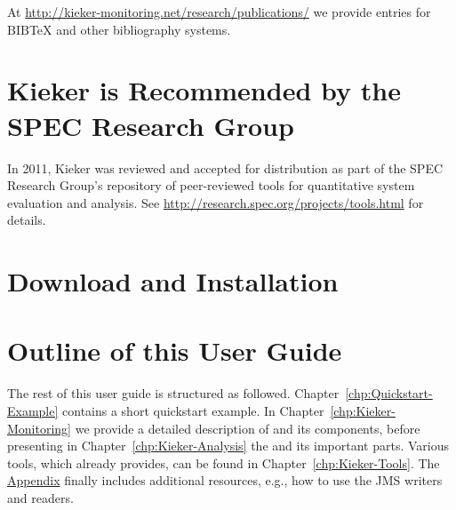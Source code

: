 		\noindent At \url{http://kieker-monitoring.net/research/publications/} we provide entries for $\mathrm{B\scriptstyle IB}\!$\TeX{} and other bibliography systems.

	\section{Kieker is Recommended by the SPEC Research Group}
		In 2011, Kieker was reviewed and accepted for distribution as part of the SPEC Research Group's repository of peer-reviewed tools for quantitative system evaluation and analysis. See \url{http://research.spec.org/projects/tools.html} for details.
	
	\section{Download and Installation}
		
	\section{Outline of this User Guide}
		The rest of this user guide is structured as followed. Chapter~\ref{chp:Quickstart-Example} contains a short quickstart example. In Chapter~\ref{chp:Kieker-Monitoring} we provide a detailed description of \KiekerMonitoringPart{} and its components, before presenting in Chapter~\ref{chp:Kieker-Analysis} the \KiekerAnalysisPart{} and its important parts. Various tools, which \Kieker{} already provides, can be found in Chapter~\ref{chp:Kieker-Tools}. The \hyperlink{hypertarget:appendix}{Appendix} finally includes additional resources, e.g., how to use the JMS writers and readers. 

		\vspace{1cm}

